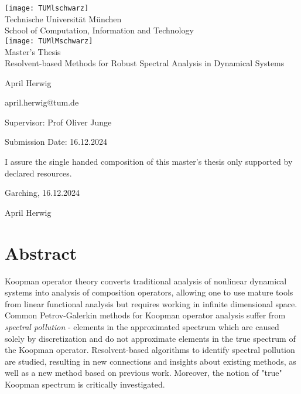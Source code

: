 \pagestyle{empty}
\begin{titlepage}
\begin{center}
\texttt{[image: TUMlschwarz]}\\[3mm]
\sf
{\Large
  Technische Universit\"at M\"unchen\\[5mm]
  School of Computation, Information and Technology\\[8mm]
}
\normalsize
\texttt{[image: TUMlMschwarz]}\\[15mm]

Master's Thesis\\[15mm]

{\LARGE
  Resolvent-based Methods for Robust Spectral Analysis in Dynamical Systems
}
\bigskip

\normalsize

April Herwig

april.herwig@tum.de
\end{center}
\vspace*{75mm}

Supervisor: Prof Oliver Junge
\medskip

Submission Date: 16.12.2024

\end{titlepage}

\vspace*{150mm}

I assure the single handed composition of this master's thesis only supported by declared resources.
\bigskip

Garching, 16.12.2024


April Herwig
\newpage

\section*{Abstract}

Koopman operator theory converts traditional analysis of nonlinear dynamical systems into 
analysis of composition operators, allowing one to use mature tools from linear functional 
analysis but requires working in infinite dimensional space. Common Petrov-Galerkin 
methods for Koopman operator analysis suffer from \emph{spectral pollution} - elements 
in the approximated spectrum which are caused solely by discretization and do not 
approximate elements in the true spectrum of the Koopman operator. Resolvent-based 
algorithms to identify spectral pollution are studied, resulting in new connections and 
insights about existing methods, as well as a new method based on previous work. 
Moreover, the notion of "true" Koopman spectrum is critically investigated. 
